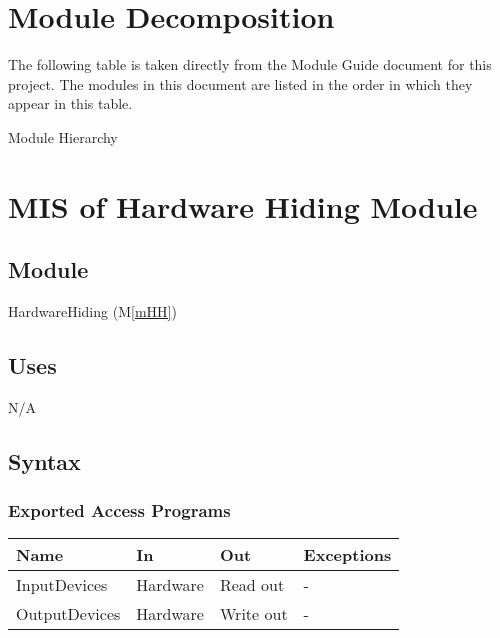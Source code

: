 \documentclass[12pt, titlepage]{article}
\newcommand{\mref}[1]{M\ref{#1}}
\begin{document}
\section{Module Decomposition}

The following table is taken directly from the Module Guide document for this
project. The modules in this document are listed in the order in which they
appear in this table.

\begin{table}[h!]
    \centering
    
    \caption{Module Hierarchy}
    \label{TblMH}
\end{table}

\newpage

\section{MIS of Hardware Hiding Module} \label{Mod:HH}


\subsection{Module}
HardwareHiding (\mref{mHH})

\subsection{Uses}
N/A

\subsection{Syntax}

\subsubsection{Exported Access Programs}

\begin{center}
    \begin{tabular}{p{3cm} p{4cm} p{4cm} p{2cm}}
        \hline
        \textbf{Name} & \textbf{In} & \textbf{Out} & \textbf{Exceptions} \\
        \hline
        InputDevices & Hardware & Read out & - \\
        OutputDevices & Hardware & Write out & - \\
        \hline
    \end{tabular}
\end{center}
\end{document}
